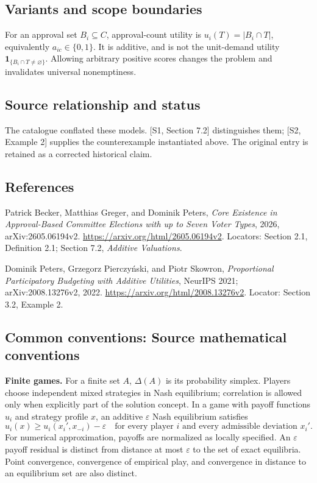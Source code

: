 \documentclass[11pt,a4paper]{article}
\begin{document}
\subsection*{Variants and scope boundaries}
For an approval set \(B_i\subseteq C\), approval-count utility is
\(u_i(T)=|B_i\cap T|\), equivalently \(a_{ic}\in\{0,1\}\).
It is additive, and is not the unit-demand utility
\(\mathbf 1_{\{B_i\cap T\ne\varnothing\}}\).
Allowing arbitrary positive scores changes the problem and invalidates
universal nonemptiness.

\subsection*{Source relationship and status}
The catalogue conflated these models. [S1, Section 7.2] distinguishes
them; [S2, Example 2] supplies the counterexample instantiated above.
The original entry is retained as a corrected historical claim.

\subsection*{References}
\begingroup\footnotesize\raggedright
\noindent[S1] Patrick Becker, Matthias Greger, and Dominik Peters,
\emph{Core Existence in Approval-Based Committee Elections with up to
Seven Voter Types}, 2026, arXiv:2605.06194v2.
\url{https://arxiv.org/html/2605.06194v2}.
Locators: Section 2.1, Definition 2.1; Section 7.2, \emph{Additive Valuations}.

\noindent[S2] Dominik Peters, Grzegorz Pierczy\'nski, and Piotr Skowron,
\emph{Proportional Participatory Budgeting with Additive Utilities},
NeurIPS 2021; arXiv:2008.13276v2, 2022.
\url{https://arxiv.org/html/2008.13276v2}.
Locator: Section 3.2, Example 2.
\par\endgroup

\subsection*{Common conventions: Source mathematical conventions}

\textbf{Finite games.} For a finite set $A$, $\Delta(A)$ is its probability
simplex. Players choose independent mixed strategies in Nash equilibrium;
correlation is allowed only when explicitly part of the solution concept.
In a game with payoff functions $u_i$ and strategy profile $x$, an additive
$\varepsilon$ Nash equilibrium satisfies
\[
 u_i(x)\geq u_i(x_i',x_{-i})-\varepsilon
 \quad\text{for every player $i$ and every admissible deviation $x_i'$}.
\]
For numerical approximation, payoffs are normalized as locally specified.
An $\varepsilon$ payoff residual is distinct from distance at most
$\varepsilon$ to the set of exact equilibria. Point convergence, convergence
of empirical play, and convergence in distance to an equilibrium set are
also distinct.
\end{document}
